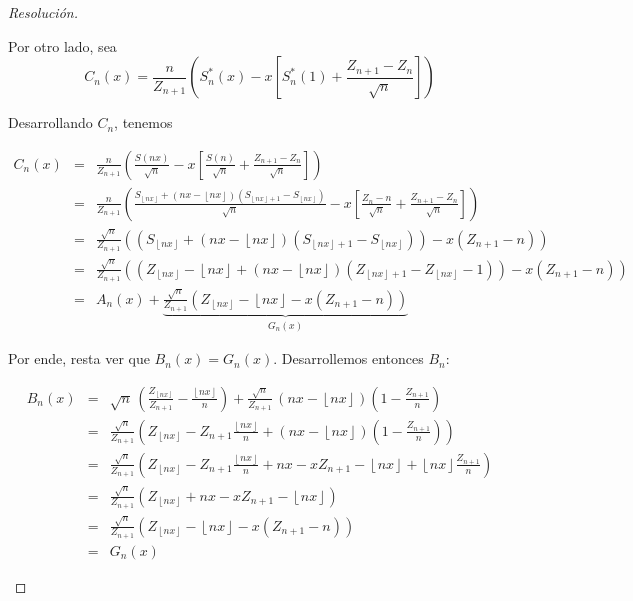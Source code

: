 \documentclass[a4paper,11pt]{article}
\newcommand{\Sst}[1]{S_n^{*}(#1)}
\newcommand{\floor}[1]{\left\lfloor #1 \right\rfloor}
\newcommand{\fnx}{\floor{nx}}
\begin{document}
\begin{proof}[Resoluci\'on]
\begin{enumerate}
    Por otro lado, sea
    $$C_n(x) = \frac{n}{Z_{n+1}} \left(\Sst{x} - x \left[ \Sst{1} + \frac{Z_{n+1} - Z_n}{\sqrt{n}} \right] \right)$$

    Desarrollando $C_n$, tenemos

    \begin{eqnarray*}
        C_n(x) &=& \frac{n}{Z_{n+1}} \left(\frac{S(nx)}{\sqrt{n}} - x \left[ \frac{S(n)}{\sqrt{n}} + \frac{Z_{n+1} - Z_n}{\sqrt{n}} \right] \right) \\
            &=& \frac{n}{Z_{n+1}} \left(\frac{S_{\floor{nx}} + (nx - \floor{nx}) (S_{\floor{nx}+1} - S_{\floor{nx}})}{\sqrt{n}} - x \left[ \frac{Z_n - n}{\sqrt{n}} + \frac{Z_{n+1} - Z_n}{\sqrt{n}} \right] \right) \\
            &=& \frac{\sqrt{n}}{Z_{n+1}} \left( \left(S_{\floor{nx}} + (nx - \floor{nx}) (S_{\floor{nx}+1} - S_{\floor{nx}})\right) - x \left( Z_{n+1} - n \right) \right) \\
            &=& \frac{\sqrt{n}}{Z_{n+1}} \left( \left(Z_{\floor{nx}} - \floor{nx} + (nx - \floor{nx}) (Z_{\floor{nx}+1} - Z_{\floor{nx}} - 1)\right) - x \left( Z_{n+1} - n \right) \right) \\
            &=& A_n(x) + \underbrace{ \frac{\sqrt{n}}{Z_{n+1}} \left(Z_{\floor{nx}} - \floor{nx}  - x \left( Z_{n+1} - n \right)\right) }_{G_n(x)}
    \end{eqnarray*}

    Por ende, resta ver que $B_n(x) = G_n(x)$. Desarrollemos entonces $B_n$:

    \begin{eqnarray*}    
        B_n(x) &=& \sqrt{n} \, \left(\frac{Z_{\fnx}}{Z_{n+1}} − \frac{\fnx}{n} \right) + \frac{\sqrt{n}}{Z_{n+1}} \, (nx - \floor{nx}) \left(1 - \frac{Z_{n+1}}{n}\right) \\
            &=& \frac{\sqrt{n}}{Z_{n+1}} \left( Z_{\fnx} - Z_{n+1} \frac{\fnx}{n} + (nx - \floor{nx}) \left(1 - \frac{Z_{n+1}}{n}\right) \right) \\
            &=& \frac{\sqrt{n}}{Z_{n+1}} \left( Z_{\fnx} - Z_{n+1} \frac{\fnx}{n} + nx - x Z_{n+1} - \fnx + \fnx \frac{Z_{n+1}}{n} \right) \\
            &=& \frac{\sqrt{n}}{Z_{n+1}} \left( Z_{\fnx} + nx - x Z_{n+1} - \fnx \right) \\
            &=& \frac{\sqrt{n}}{Z_{n+1}} \left( Z_{\fnx} - \fnx - x  (Z_{n+1} - n) \right) \\
            &=& G_n(x)
    \end{eqnarray*}


\end{enumerate}
\end{proof}
\end{document}
